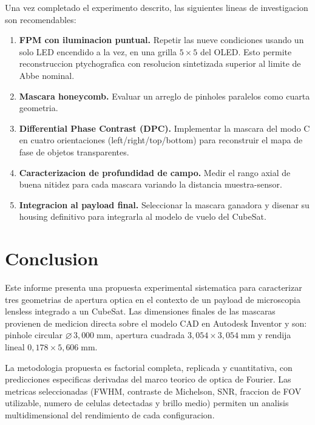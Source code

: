 \documentclass[11pt,a4paper,oneside]{report}
\begin{document}
Una vez completado el experimento descrito, las siguientes lineas de
investigacion son recomendables:

\begin{enumerate}[leftmargin=2.2em]
  \item \textbf{FPM con iluminacion puntual.} Repetir las nueve condiciones
        usando un solo LED encendido a la vez, en una grilla $5 \times 5$ del
        OLED. Esto permite reconstruccion ptychografica con resolucion
        sintetizada superior al limite de Abbe nominal.
  \item \textbf{Mascara honeycomb.} Evaluar un arreglo de pinholes paralelos
        como cuarta geometria.
  \item \textbf{Differential Phase Contrast (DPC).} Implementar la mascara
        del modo C en cuatro orientaciones (left/right/top/bottom) para
        reconstruir el mapa de fase de objetos transparentes.
  \item \textbf{Caracterizacion de profundidad de campo.} Medir el rango
        axial de buena nitidez para cada mascara variando la distancia
        muestra-sensor.
  \item \textbf{Integracion al payload final.} Seleccionar la mascara
        ganadora y disenar su housing definitivo para integrarla al
        modelo de vuelo del CubeSat.
\end{enumerate}

\chapter{Conclusion}

Este informe presenta una propuesta experimental sistematica para
caracterizar tres geometrias de apertura optica en el contexto de un
payload de microscopia lensless integrado a un CubeSat. Las dimensiones
finales de las mascaras provienen de medicion directa sobre el modelo CAD
en Autodesk Inventor y son: pinhole circular $\varnothing\,3{,}000\;\mathrm{mm}$,
apertura cuadrada $3{,}054 \times 3{,}054\;\mathrm{mm}$ y rendija lineal
$0{,}178 \times 5{,}606\;\mathrm{mm}$.

La metodologia propuesta es factorial completa, replicada y cuantitativa,
con predicciones especificas derivadas del marco teorico de optica de
Fourier. Las metricas seleccionadas (FWHM, contraste de Michelson, SNR,
fraccion de FOV utilizable, numero de celulas detectadas y brillo medio)
permiten un analisis multidimensional del rendimiento de cada configuracion.
\end{document}
